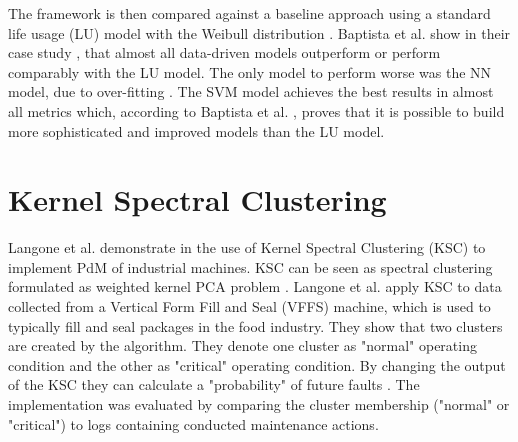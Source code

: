 The framework is then compared against a baseline approach using a standard life usage (LU) model  with the Weibull distribution . 
Baptista et al. show in their case study \cite{Baptista2018}, that almost all data-driven models outperform or perform comparably with the LU model.
The only model to perform worse was the NN model, due to over-fitting \cite{Baptista2018}.
The SVM model achieves the best results in almost all metrics which, according to Baptista et al. \cite{Baptista2018}, proves that it is possible to build more sophisticated and improved models than the LU model. 


\section{Kernel Spectral Clustering}
Langone et al. demonstrate in \cite{Langone2013} the use of Kernel Spectral Clustering (KSC) to implement PdM of industrial machines.
KSC can be seen as spectral clustering formulated as weighted kernel PCA problem \cite{Langone2013}.
Langone et al. apply KSC to data collected from a Vertical Form Fill and Seal (VFFS) machine, which is used to typically fill and seal packages in the food industry.
They show that two clusters are created by the algorithm.
They denote one cluster as "normal" operating condition and the other as "critical" operating condition.
By changing the output of the KSC they can calculate a "probability" of future faults \cite{Langone2013}.
The implementation was evaluated by comparing the cluster membership ("normal" or "critical") to logs containing conducted maintenance actions.





